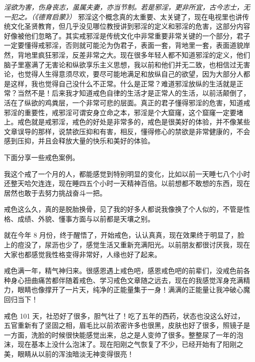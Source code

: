 \textit{淫欲为害，伤身丧志，虽属夫妻，亦当节制。若是邪淫，更非所宜，古今志士，无一犯之。（《德育启蒙》）} 邪淫这个概念真的太重要、太关键了，现在电视里也讲传统文化圣贤教育，但几乎没见哪位教授讲到邪淫的定义和邪淫的危害，这部分内容好像被他们忽略了。其实戒邪淫是传统文化中非常重要非常关键的一个部分，君子一定要懂得戒邪淫，否则就可能沦为伪君子，表面一套，背地里一套，表面道貌岸然，背地里疯狂邪淫，反差非常之大。现在很多年轻人都不知道邪淫的定义，他们脑子里塞满了无害论和纵欲享乐主义思想，我以前和他们并无二致，也相信过无害论，也觉得人生得意须尽欢，要尽可能地满足和放纵自己的欲望，因为大部分人都是这样，我也觉得自己没什么不正常。什么是正常？难道邪淫放纵的生活就是正常？当然不是！后来我才知道戒色自律的生活才是正常人的生活，以前活颠倒了，活在了纵欲的鸡粪层，一个非常可悲的层面。真正的君子懂得邪淫的危害，知道戒邪淫的重要性，戒邪淫可谓安身立命之本，邪淫是个大窟窿，这个窟窿一定要堵上。戒色就是戒邪淫，戒色的好处是非常多的，戒色是很美好的体验，并不像某些文章误导的那样，说禁欲压抑和有害，相反，懂得修心的禁欲是非常健康的，不会感到压抑，并且会释放大量的快乐和美好的体验。

下面分享一些戒色案例。

\begin{case}[戒色]
    我这个戒了一个月的人，都能感觉到特别明显的变化，比如以前一天睡七八个小时还整天哈欠连连，现在睡四五个小时一天精神百倍。以前想都不敢想的东西，现在居然也敢于去努力挑战奋斗一把。
\end{case}

\begin{case}[戒色]
    戒色这么久，真的是脱胎换骨，见了我的好多人都说我像换了个人似的，不管是性格、成绩、外貌、懂事方面与以前都是天壤之别。
\end{case}

\begin{case}[戒色]
    就在今年 8 月份，终于醒悟了，开始戒色，认认真真，现在效果终于明显了，脸上的痘没了，尿沥也少了，感觉生活又重新充满阳光。以前朋友都很讨厌我，现在大家也都感觉我性格变得非常好，人缘也好了起来。
\end{case}

\begin{case}[戒色]
    戒色满一年，精气神归来。很感恩遇上戒色吧，感恩戒色吧的前辈们，没戒色前各种身心扭曲痛苦都伴随着戒色、学习戒色文章随之远去，现在的我感觉浑身充满精力，眼睛也像撑开了一片天，纯净的正能量集于一身！满满的正能量让我冲破心魔回归当下！
\end{case}

\begin{case}[戒色]
    戒色 101 天，社恐好了很多，胆气壮了！吃了五年的西药，状态也没这么好过，五官重新有了坚固之相，眉毛比以前浓密许多也很黑，皮肤也好了很多，照镜子是一方面，洗脸的时候很快能感觉出来，总之是人变帅了很多。整整尿了一年的泡沫，现在基本上没什么泡沫了。现在阳刚之气恢复了不少，已经开始有了阳刚之美，眼睛从以前的浑浊暗淡无神变得很亮！
\end{case}

